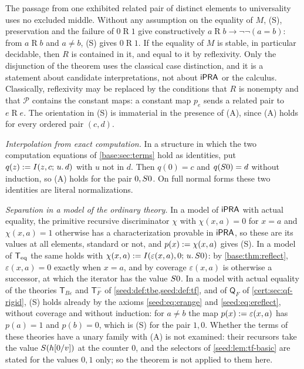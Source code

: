 The passage from one exhibited related pair of distinct elements to
universality uses no excluded middle. Without any assumption on the equality of
$M$, (S), preservation and the failure of $0\mathrel R1$ give constructively
$a\mathrel Rb\to\neg\neg(a=b)$: from $a\mathrel Rb$ and $a\neq b$, (S) gives
$0\mathrel R1$. If the equality of $M$ is stable, in particular decidable, then
$R$ is contained in it, and equal to it by reflexivity. Only the disjunction of
the theorem uses the classical case distinction, and it is a statement about
candidate interpretations, not about $\mathsf{iPRA}$ or the calculus. Classically,
reflexivity may be replaced by the conditions that $R$ is nonempty and that
$\mathcal P$ contains the constant maps: a constant map $p_e$ sends a related
pair to $e\mathrel Re$. The orientation in (S) is immaterial in the presence of
(A), since (A) holds for every ordered pair $(c,d)$.

\emph{Interpolation from exact computation.} In a structure in which the two
computation equations of \cref{base:sec:terms} hold as identities, put
$q(z)\mathrel{:=}I(z,c;\,u.\,d)$ with $u$ not in $d$. Then $q(0)=c$ and
$q(S 0)=d$ without induction, so (A) holds for the pair $0,S 0$. On full
normal forms these two identities are literal normalizations.

\emph{Separation in a model of the ordinary theory.} In a model of $\mathsf{iPRA}$ with
actual equality, the primitive recursive discriminator $\chi$ with
$\chi(x,a)=0$ for $x=a$ and $\chi(x,a)=1$ otherwise has a characterization
provable in $\mathsf{iPRA}$, so these are its values at all elements, standard or not,
and $p(x)\mathrel{:=}\chi(x,a)$ gives (S). In a model of $\mathsf{T}_{\mathrm{eq}}$ the same holds with
$\chi(x,a)\mathrel{:=}I(\varepsilon(x,a),0;\,u.\,S 0)$: by \cref{base:thm:reflect},
$\varepsilon(x,a)=0$ exactly when $x=a$, and by coverage $\varepsilon(x,a)$ is
otherwise a successor, at which the iterator has the value $S 0$. In a model
with actual equality of the theories $\mathsf T_{B\varepsilon}$ and
$\mathsf T_F^{-}$ of \cref{seed:def:tbe,seed:def:tf}, and of $\mathsf Q_F$ of
\cref{cert:sec:qf-rigid}, (S) holds already by the axioms
\eqref{seed:eq:erange} and \eqref{seed:eq:ereflect}, without coverage and
without induction: for $a\neq b$ the map $p(x)\mathrel{:=}\varepsilon(x,a)$ has
$p(a)=1$ and $p(b)=0$, which is (S) for the pair $1,0$.
Whether the terms of these theories have a unary family with (A) is not
examined: their recursors take the value $S(h[0/v])$ at the counter
$0$, and the selectors of \cref{seed:lem:tf-basic} are stated for the values
$0,1$ only; so the theorem is not applied to them here.

